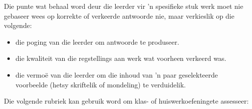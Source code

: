 Die punte wat behaal word deur die leerder vir 'n spesifieke stuk werk moet nie gebaseer wees op korrekte of verkeerde antwoorde nie, maar verkieslik op die volgende:

\begin{itemize}[noitemsep]
\item
  die poging van die leerder om antwoorde te produseer.
\item
  die kwaliteit van die regstellings aan werk wat voorheen verkeerd was.
\item
  die vermoë van die leerder om die inhoud van 'n paar geselekteerde voorbeelde (hetsy skriftelik of mondeling) te verduidelik.
\end{itemize}
Die volgende rubriek kan gebruik word om klas- of huiswerkoefeningete assesseer:

